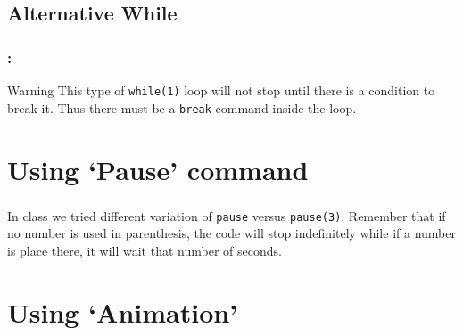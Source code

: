 \documentclass[11pt]{beamer}
\begin{document}
\subsection{Alternative While}

\begin{frame}[fragile]
	\frametitle{\secname: \subsecname}
	\vspace{-2mm}
	
	\vspace{-2.7mm}	
	\begin{alertblock}{Warning}
	This type of \verb|while(1)| loop will not stop until there is a condition to break it. Thus there must be a \verb|break| command inside the loop. 
	\end{alertblock}	
\end{frame}


\section{Using `Pause' command}

\begin{frame}[fragile]
	\frametitle{\secname}
	\vspace{-2mm}
	
	\begin{block}{}
		In class we tried different variation of \verb|pause| versus \verb|pause(3)|. Remember that if no number is used in parenthesis, the code will stop indefinitely while if a number is place there, it will wait that number of seconds.
	\end{block}
\end{frame}

\section{Using `Animation'}
\end{document}
